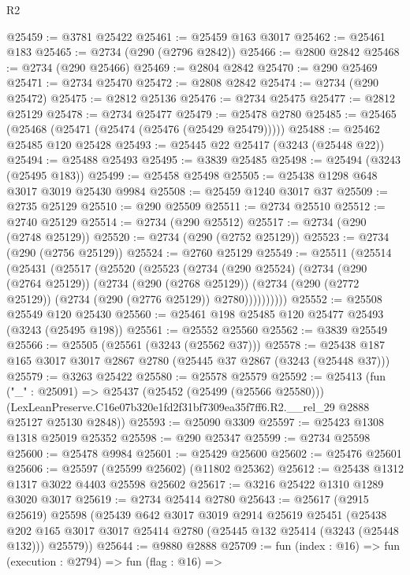 \begin{lexlean}{R2}
\begin{coremodule}
@25459 := @3781 @25422
@25461 := @25459 @163 @3017
@25462 := @25461 @183
@25465 := @2734 (@290 (@2796 @2842))
@25466 := @2800 @2842
@25468 := @2734 (@290 @25466)
@25469 := @2804 @2842
@25470 := @290 @25469
@25471 := @2734 @25470
@25472 := @2808 @2842
@25474 := @2734 (@290 @25472)
@25475 := @2812 @25136
@25476 := @2734 @25475
@25477 := @2812 @25129
@25478 := @2734 @25477
@25479 := @25478 @2780
@25485 := @25465 (@25468 (@25471 (@25474 (@25476 (@25429 @25479)))))
@25488 := @25462 @25485 @120 @25428
@25493 := @25445 @22 @25417 (@3243 (@25448 @22))
@25494 := @25488 @25493
@25495 := @3839 @25485
@25498 := @25494 (@3243 (@25495 @183))
@25499 := @25458 @25498
@25505 := @25438 @1298 @648 @3017 @3019 @25430 @9984
@25508 := @25459 @1240 @3017 @37
@25509 := @2735 @25129
@25510 := @290 @25509
@25511 := @2734 @25510
@25512 := @2740 @25129
@25514 := @2734 (@290 @25512)
@25517 := @2734 (@290 (@2748 @25129))
@25520 := @2734 (@290 (@2752 @25129))
@25523 := @2734 (@290 (@2756 @25129))
@25524 := @2760 @25129
@25549 := @25511
    (@25514
      (@25431
        (@25517
          (@25520
            (@25523
              (@2734
                (@290 @25524)
                (@2734
                  (@290 (@2764 @25129))
                  (@2734
                    (@290 (@2768 @25129))
                    (@2734 (@290 (@2772 @25129)) (@2734 (@290 (@2776 @25129)) @2780))))))))))
@25552 := @25508 @25549 @120 @25430
@25560 := @25461 @198 @25485 @120 @25477 @25493 (@3243 (@25495 @198))
@25561 := @25552 @25560
@25562 := @3839 @25549
@25566 := @25505 (@25561 (@3243 (@25562 @37)))
@25578 := @25438 @187 @165 @3017 @3017 @2867 @2780 (@25445 @37 @2867 (@3243 (@25448 @37)))
@25579 := @3263 @25422
@25580 := @25578 @25579
@25592 := @25413
    (fun ("_" : @25091) =>
    @25437
      (@25452 (@25499 (@25566 @25580)))
      (LexLeanPreserve.C16e07b320e1fd2f31bf7309ea35f7ff6.R2.__rel_29 @2888 @25127 @25130 @2848))
@25593 := @25090 @3309
@25597 := @25423 @1308 @1318 @25019 @25352
@25598 := @290 @25347
@25599 := @2734 @25598
@25600 := @25478 @9984
@25601 := @25429 @25600
@25602 := @25476 @25601
@25606 := @25597 (@25599 @25602) (@11802 @25362)
@25612 := @25438 @1312 @1317 @3022 @4403 @25598 @25602
@25617 := @3216 @25422 @1310 @1289 @3020 @3017
@25619 := @2734 @25414 @2780
@25643 := @25617
    (@2915 @25619)
    @25598
    (@25439
      @642
      @3017
      @3019
      @2914
      @25619
      @25451
      (@25438 @202 @165 @3017 @3017 @25414 @2780 (@25445 @132 @25414 (@3243 (@25448 @132))) @25579))
@25644 := @9880 @2888
@25709 := fun (index : @16) =>
  fun (execution : @2794) =>
  fun (flag : @16) =>

\end{coremodule}
\end{lexlean}
